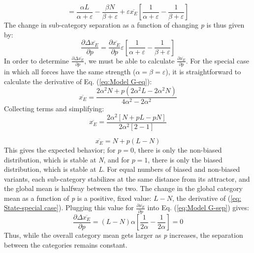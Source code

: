 \begin{equation}
=\frac{\alpha L}{\alpha+\varepsilon}-\frac{\beta N}{\beta+\varepsilon}+\varepsilon\overline{x_{E}}\left[\frac{1}{\alpha+\varepsilon}-\frac{1}{\beta+\varepsilon}\right]
\end{equation}
The change in sub-category separation as a function of changing \emph{p}
is thus given by:
\begin{equation}
\frac{\partial\Delta\overline{x_{E}}}{\partial p}=\frac{\partial\overline{x_{E}}}{\partial p}\varepsilon\left[\frac{1}{\alpha+\varepsilon}-\frac{1}{\beta+\varepsilon}\right]\label{eq:Model G-sep}
\end{equation}
In order to determine $\frac{\partial\Delta\overline{x_{E}}}{\partial p}$,
we must be able to calculate $\frac{\partial\overline{x_{E}}}{\partial p}$.
For the special case in which all forces have the same strength ($\alpha=\beta=\varepsilon$),
it is straightforward to calculate the derivative of Eq. (\ref{eq:Model G-eq}):
\begin{equation}
\overline{x_{E}}=\frac{2\alpha^{2}N+p(2\alpha^{2}L-2\alpha^{2}N)}{4\alpha^{2}-2\alpha^{2}}
\end{equation}
Collecting terms and simplifying:
\begin{equation}
\overline{x_{E}}=\frac{2\alpha^{2}[N+pL-pN]}{2\alpha^{2}[2-1]}
\end{equation}

\begin{equation}
\overline{x_{E}}=N+p(L-N)\label{eq: State-special case}
\end{equation}
This gives the expected behavior; for $p=0$, there is only the non-biased
distribution, which is stable at \emph{N}, and for $p=1$, there is
only the biased distribution, which is stable at \emph{L}. For equal
numbers of biased and non-biased variants, each sub-category stabilizes
at the same distance from its attractor, and the global mean is halfway
between the two. The change in the global category mean as a function
of \emph{p} is a positive, fixed value: $L-N$, the derivative of
(\ref{eq: State-special case}). Plugging this value for $\frac{\partial\overline{x_{E}}}{\partial p}$
into Eq. (\ref{eq:Model G-sep}) gives:
\begin{equation}
\frac{\partial\Delta\overline{x_{E}}}{\partial p}=(L-N)\alpha\left[\frac{1}{2\alpha}-\frac{1}{2\alpha}\right]=0\label{eq:separation-special case}
\end{equation}
Thus, while the overall category mean gets larger as \emph{p} increases,
the separation between the categories remains constant. 


